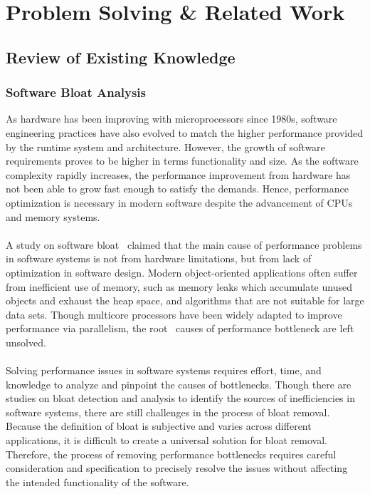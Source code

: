 \section{Problem Solving & Related Work}
\label{sec:problem-solving-related-work}

\subsection{Review of Existing Knowledge}
\label{subsec:review-of-existing-knowledge}

\subsubsection*{Software Bloat Analysis}

As hardware has been improving with microprocessors since 1980s, software engineering practices have 
also evolved to match the higher performance provided by the runtime system and architecture.
However, the growth of software requirements proves to be higher in terms functionality and size.
As the software complexity rapidly increases, the performance improvement from hardware has not been 
able to grow fast enough to satisfy the demands.
Hence, performance optimization is necessary in modern software despite the advancement of CPUs and 
memory systems.
\\\\
A study on software bloat~\cite{Software_Bloat_Analysis} claimed that the main cause of performance 
problems in software systems is not from hardware limitations, but from lack of optimization in software design.
Modern object-oriented applications often suffer from inefficient use of memory, such as memory leaks 
which accumulate unused objects and exhaust the heap space, and algorithms that are not suitable for 
large data sets.
Though multicore processors have been widely adapted to improve performance via parallelism, the root \
causes of performance bottleneck are left unsolved.
\\\\
Solving performance issues in software systems requires effort, time, and knowledge to analyze and 
pinpoint the causes of bottlenecks.
Though there are studies on bloat detection and analysis to identify the sources of inefficiencies 
in software systems, there are still challenges in the process of bloat removal.
Because the definition of bloat is subjective and varies across different applications, it is difficult 
to create a universal solution for bloat removal.
Therefore, the process of removing performance bottlenecks requires careful consideration and specification 
to precisely resolve the issues without affecting the intended functionality of the software.

